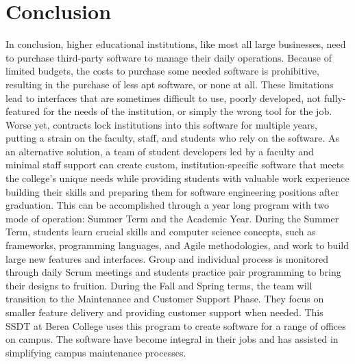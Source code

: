 \section{Conclusion}
In conclusion, higher educational institutions, like most all large businesses, need to purchase third-party software to manage their daily operations. Because of limited budgets, the costs to purchase some needed software is prohibitive, resulting in the purchase of less apt software, or none at all. These limitations lead to interfaces that are sometimes difficult to use, poorly developed, not fully-featured for the needs of the institution, or simply the wrong tool for the job. Worse yet, contracts lock institutions into this software for multiple years, putting a strain on the faculty, staff, and students who rely on the software. As an alternative solution, a team of student developers led by a faculty and minimal staff support can create custom, institution-specific software that meets the college's unique needs while providing students with valuable work experience building their skills and preparing them for software engineering positions after graduation. This can be accomplished through a year long program with two mode of operation: Summer Term and the Academic Year. During the Summer Term, students learn crucial skills and computer science concepts, such as frameworks, programming languages, and Agile methodologies, and work to build large new features and interfaces. Group and individual process is monitored through daily Scrum meetings and students practice pair programming to bring their designs to fruition. During the Fall and Spring terms, the team will transition to the Maintenance and Customer Support Phase. They focus on smaller feature delivery and providing customer support when needed. This SSDT at Berea College uses this program to create software for a range of offices on campus. The software have become integral in their jobs and has assisted in simplifying campus maintenance processes.